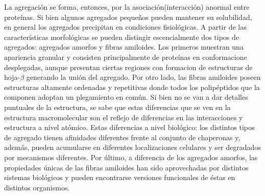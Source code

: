 La agregación se forma, entonces, por la asociación(interacción) anormal entre proteínas.
Si bien algunos agregados pequeños pueden mantener su solubilidad, en general los agregados precipitan en condiciones fisiológicas. 
A partir de las características morfológicas se pueden distingir escencialmente dos tipos de agregados: agregados amorfos y fibras amiloides.
Los primeros muestran una apariencia granular y consisten principalmente de proteínas en conformacione desplegadas, 
aunque presentan ciertas regiones con formacion de estructuras de hoja-$\beta$ generando la unión del agregado.
Por otro lado, las fibras amiloides poseen estructuras altamente ordenadas y repetitivas donde todos los polipéptidos que la componen adoptan un plegamiento en común.
Si bien no se van a dar detalles puntuales de la estructura, se sabe que estas diferencias que se ven en la estructura macromolecular son el reflejo de diferencias en las interacciones y estructura a nivel atómico.
Estas diferencias a nivel biológico: los distintos tipos de agregado tienen afinidades diferentes frente al conjunto de chaperonas y, además, pueden acumularse en diferentes localizaciones celulares y ser degradados por mecanismos diferentes.
Por último, a diferencia de los agregados amorfos, las propiedades únicas de las fibras amiloides han sido aprovechadas por distintos sistemas biológicos y pueden encontrarse versiones funcionales de éstas en distintos organismos\cite{fowler2007functional}.



